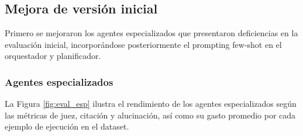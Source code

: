 \subsection{Mejora de versión inicial}
Primero se mejoraron los agentes especializados que presentaron deficiencias en la evaluación inicial, incorporándose posteriormente el prompting few-shot en el orquestador y planificador.

\subsubsection{Agentes especializados}
La Figura \ref{fig:eval_esp} ilustra el rendimiento de los agentes especializados según las métricas de juez, citación y alucinación, así como su gasto promedio por cada ejemplo de ejecución en el dataset.

